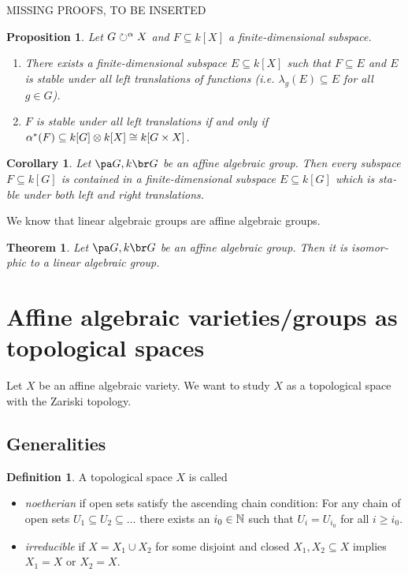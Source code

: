 \documentclass[12pt,a4paper]{scrartcl}
\theoremstyle{cplain}
\newtheorem{cor}[thmcounter]{Corollary}
\theoremstyle{cplain}
\newtheorem{thm}[thmcounter]{Theorem}
\theoremstyle{cplain}
\newtheorem{prop}[thmcounter]{Proposition}
\theoremstyle{definition}
\newtheorem*{deff}{Definition}
\begin{document}
\begin{otherlanguage}{english}
MISSING PROOFS, TO BE INSERTED

\begin{prop}
  Let $G \circlearrowright^\alpha X$ and $F \subseteq k[X]$ a finite-dimensional subspace.
  \begin{enumerate}
  \item There exists a finite-dimensional subspace $E \subseteq k[X]$ such that $F \subseteq E$ and $E$ is stable under all left translations of functions (i.e. $\lambda_g(E) \subseteq E$ for all $g \in G$).
  \item $F$ is stable under all left translations if and only if $\alpha^*(F) \subseteq k[G] \otimes k[X] \cong k[G \times X]$.
  \end{enumerate}
\end{prop}

\begin{cor}
  Let $\aav G$ be an affine algebraic group. Then every subspace $F \subseteq k[G]$ is contained in a finite-dimensional subspace $E \subseteq k[G]$ which is stable under both left and right translations.
\end{cor}

We know that linear algebraic groups are affine algebraic groups.
\begin{thm}
  Let $\aav G$ be an affine algebraic group. Then it is isomorphic to a linear algebraic group.
\end{thm}


\section{Affine algebraic varieties/groups as topological spaces}
Let $X$ be an affine algebraic variety. We want to study $X$ as a topological space with the Zariski topology.

\subsection{Generalities}
\begin{deff}
  A topological space $X$ is called
  \begin{itemize}
  \item \emph{noetherian} if open sets satisfy the ascending chain condition: For any chain of open sets $U_1\subseteq U_2 \subseteq \ldots $ there exists an $i_0\in \mathbb N$ such that $U_i = U_{i_0}$ for all $i\ge i_0$.
  \item \emph{irreducible} if $X = X_1 \cup X_2$ for some disjoint and closed $X_1,X_2 \subseteq X$ implies $X_1 = X$ or $X_2 = X$.
  \end{itemize}
\end{deff}


\end{otherlanguage}
\end{document}
